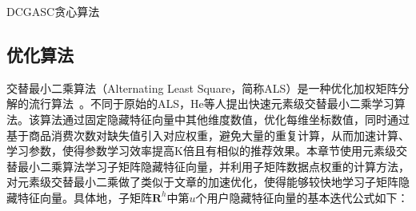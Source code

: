  \begin{algorithm}
	\begin{algorithmic}[1]
		\caption{DCGASC贪心算法}
		\label{algo-wpitf-dcgasc}
		
		
		\ENDFOR
		
	\end{algorithmic}
\end{algorithm}

\subsection{优化算法}
\label{sec-lwmf-opt}
交替最小二乘算法（Alternating Least Square，简称ALS）是一种优化加权矩阵分解的流行算法~\cite{hu2008collaborative}。不同于原始的ALS，He等人\cite{he2016fast}提出快速元素级交替最小二乘学习算法。该算法通过固定隐藏特征向量中其他维度数值，优化每维坐标数值，同时通过基于商品消费次数对缺失值引入对应权重，避免大量的重复计算，从而加速计算、学习参数，使得参数学习效率提高K倍且有相似的推荐效果。本章节使用元素级交替最小二乘算法学习子矩阵隐藏特征向量，并利用子矩阵数据点权重的计算方法，对元素级交替最小二乘做了类似于文章\cite{he2016fast}的加速优化，使得能够较快地学习子矩阵隐藏特征向量。具体地，子矩阵$\mathbf{R}^h$中第$u$个用户隐藏特征向量的基本迭代公式如下：

